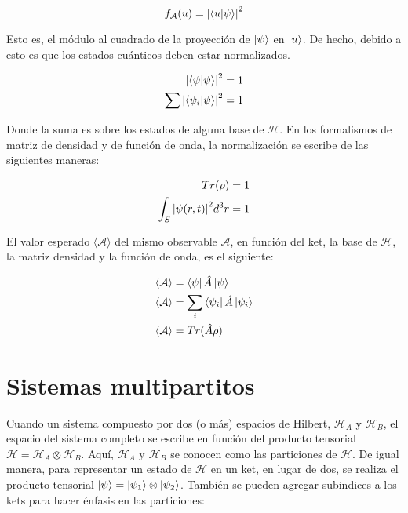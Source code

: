 \begin{equation}
    f_\mathcal{A}(u) = \abs{\braket{u}{\psi}}^2
\end{equation}

Esto es, el módulo al cuadrado de la proyección de $\ket{\psi}$ en $\ket{u}$. De hecho, debido a esto es que los estados cuánticos deben estar normalizados.

\begin{align}
    \abs{\braket{\psi}}^2 &= 1 \\
    \sum\limits \abs{\braket{\psi_i}{\psi}}^2 &= 1
\end{align}

Donde la suma es sobre los estados de alguna base de $\mathcal{H}$. En los formalismos de matriz de densidad y de función de onda, la normalización se escribe de las siguientes maneras:

\begin{align}
    Tr(\rho) &= 1 \\
    \int_S \abs{\psi(r,t)}^2 d^3 r &= 1
\end{align}

El valor esperado $\langle \mathcal{A} \rangle$ del mismo observable $\mathcal{A}$, en función del ket, la base de $\mathcal{H}$, la matriz densidad y la función de onda, es el siguiente:

\begin{align}
    \langle \mathcal{A} \rangle &= \bra{\psi} \hat{A} \ket{\psi} \\
    \langle \mathcal{A} \rangle &= \sum\limits_i \bra{\psi_i} \hat{A} \ket{\psi_i} \\
    \langle \mathcal{A} \rangle &= Tr(\hat{A} \rho) \\
\end{align}

\section{Sistemas multipartitos}

Cuando un sistema compuesto por dos (o más) espacios de Hilbert, $\mathcal{H}_A$ y $\mathcal{H}_B$, el espacio del sistema completo se escribe en función del producto tensorial $\mathcal{H} = \mathcal{H}_A \otimes \mathcal{H}_B$. Aquí, $\mathcal{H}_A$ y $\mathcal{H}_B$ se conocen como las particiones de $\mathcal{H}$. De igual manera, para representar un estado de $\mathcal{H}$ en un ket, en lugar de dos, se realiza el producto tensorial $\ket{\psi} = \ket{\psi_1} \otimes \ket{\psi_2}$. También se pueden agregar subindices a los kets para hacer énfasis en las particiones:


